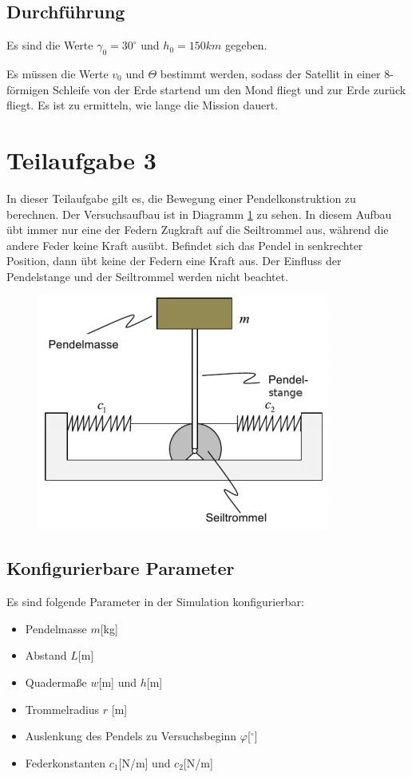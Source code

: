 \documentclass[]{scrartcl}
\begin{document}
\subsection{Durchführung}
Es sind die Werte $\gamma_{0} = 30^\circ$ und $h_{0} = 150km$ gegeben.

Es müssen die Werte $v_{0}$ und $\Theta$ bestimmt werden, sodass der Satellit in einer 8-förmigen Schleife von der Erde startend um den Mond fliegt und zur Erde zurück fliegt. Es ist zu ermitteln, wie lange die Mission dauert.

\section{Teilaufgabe 3}
In dieser Teilaufgabe gilt es, die Bewegung einer Pendelkonstruktion zu berechnen. Der Versuchsaufbau ist in Diagramm \ref{fig:3_Versuchsaufbau} zu sehen. In diesem Aufbau übt immer nur eine der Federn Zugkraft auf die Seiltrommel aus, während die andere Feder keine Kraft ausübt. Befindet sich das Pendel in senkrechter Position, dann übt keine der Federn eine Kraft aus. Der Einfluss der Pendelstange und der Seiltrommel werden nicht beachtet.

\begin{figure}[H]
\centering
\includegraphics[width=0.5\linewidth]{./3_Versuchsaufbau}
\caption{}
\label{fig:3_Versuchsaufbau}
\end{figure}

\subsection{Konfigurierbare Parameter}
Es sind folgende Parameter in der Simulation konfigurierbar:
\begin{itemize}
\item Pendelmasse $m$[kg]
\item Abstand $L$[m]
\item Quadermaße $w$[m] und $h$[m]
\item Trommelradius $r$ [m]
\item Auslenkung des Pendels zu Versuchsbeginn $\varphi$[$^\circ$]
\item Federkonstanten $c_{1}$[N/m] und $c_{2}$[N/m]
\end{itemize}
\end{document}
